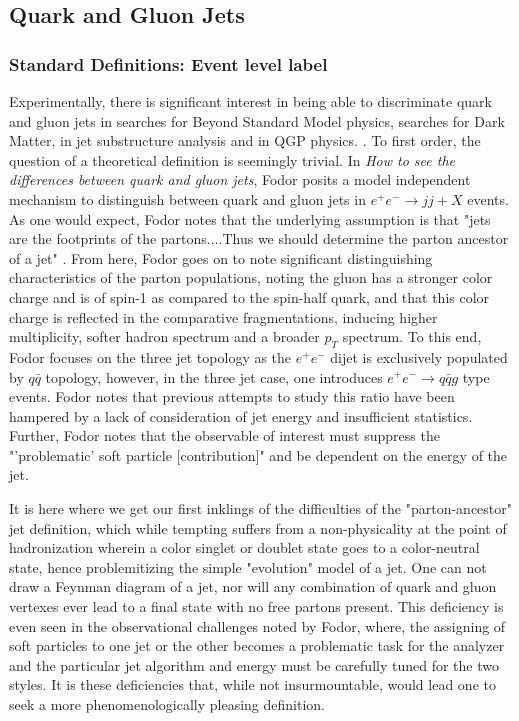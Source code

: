 \subsection{Quark and Gluon Jets}	
	\subsubsection{Standard Definitions: Event level label}
	\label{sect:standard_jet}
	Experimentally, there is significant interest in being able to discriminate quark and gluon jets in searches for Beyond Standard Model physics, searches for Dark Matter, in jet substructure analysis and in QGP physics. \cite{Gallicchio2011}\cite{Lima2017}\cite{Bhattacherjee2017}\cite{}. 
	 To first order, the question of a theoretical definition is seemingly trivial. 
	 In \textit{How to see the differences between quark and gluon jets}\cite{Fodor1990}, Fodor posits a model independent mechanism to distinguish between quark and gluon jets in $e^+ e^- \rightarrow jj+X $ events. 
	 As one would expect, Fodor notes that the underlying assumption is that "jets are the footprints of the partons....Thus we should determine the parton ancestor of a jet" \cite{Fodor1990}. 
	 From here, Fodor goes on to note significant distinguishing characteristics of the parton populations, noting the gluon has a stronger color charge and is of spin-1 as compared to the spin-half quark, and that this color charge is reflected in the comparative fragmentations, inducing higher multiplicity, softer hadron spectrum and a broader $p_T$ spectrum. 
	 To this end, Fodor focuses on the three jet topology as the $e^+e^-$ dijet is exclusively populated by $q\bar{q}$ topology, however, in the three jet case, one introduces $e^+e^-\rightarrow q\bar{q}g$ type events. 
	 Fodor notes that previous attempts to study this ratio have been hampered by a lack of consideration of jet energy and insufficient statistics. 
	 Further, Fodor notes that the observable of interest must suppress the "'problematic' soft particle [contribution]" and be dependent on the energy of the jet.

	 \hspace{0.5 cm} It is here where we get our first inklings of the difficulties of the "parton-ancestor" jet definition, which while tempting suffers from a non-physicality at the point of hadronization wherein a color singlet or doublet state goes to a color-neutral state, hence problemitizing the simple "evolution" model of a jet. 
	 One can not draw a Feynman diagram of a jet, nor will any combination of quark and gluon vertexes ever lead to a final state with no free partons present. 
	 This deficiency is even seen in the observational challenges noted by Fodor, where, the assigning of soft particles to one jet or the other becomes a problematic task for the analyzer and the particular jet algorithm and energy must be carefully tuned for the two styles. 
	 It is these deficiencies that, while not insurmountable, would lead one to seek a more phenomenologically pleasing definition. 
